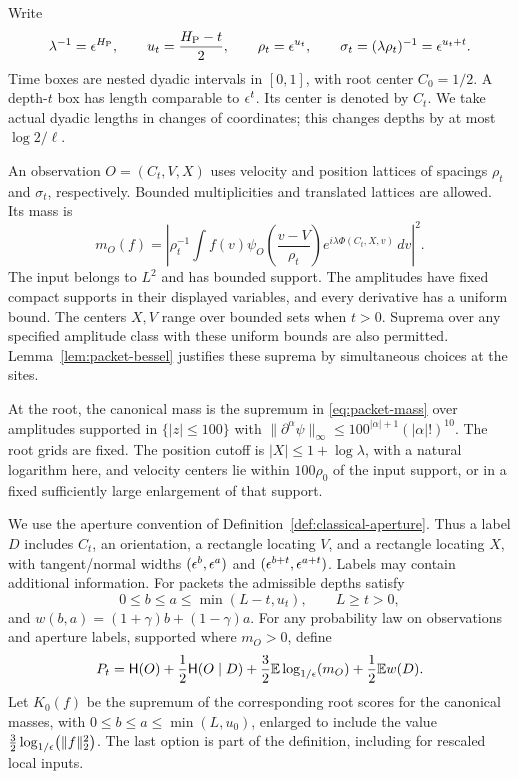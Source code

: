 Write
\begin{equation}
 \lambda^{-1}=\epsilon^{H_{\mathrm P}},\qquad
 u_t=\frac{H_{\mathrm P}-t}{2},\qquad
 \rho_t=\epsilon^{u_t},\qquad
 \sigma_t=(\lambda\rho_t)^{-1}=\epsilon^{u_t+t}.
 \label{eq:packet-scales}
\end{equation}
Time boxes are nested dyadic intervals in \([0,1]\), with root center
\(C_0=1/2\).  A depth-\(t\) box has length comparable to \(\epsilon^t\).
Its center is denoted by \(C_t\).  We take actual dyadic lengths in
changes of coordinates; this changes depths by at most
\(\log 2/\ell\).

An observation \(O=(C_t,V,X)\) uses velocity and position lattices of
spacings \(\rho_t\) and \(\sigma_t\), respectively.  Bounded
multiplicities and translated lattices are allowed.  Its mass is
\begin{equation}
 m_O(f)=\left|\rho_t^{-1}\int f(v)
  \psi_O\left(\frac{v-V}{\rho_t}\right)
  e^{i\lambda\Phi(C_t,X,v)}\,dv\right|^2.
 \label{eq:packet-mass}
\end{equation}
The input belongs to \(L^2\) and has bounded support.  The amplitudes
have fixed compact supports in their displayed variables, and every
derivative has a uniform bound.  The centers \(X,V\) range over bounded
sets when \(t>0\).  Suprema over any specified amplitude class with
these uniform bounds are also permitted.  Lemma~\ref{lem:packet-bessel}
justifies these suprema by simultaneous choices at the sites.

At the root, the canonical mass is the supremum in
\eqref{eq:packet-mass} over amplitudes supported in \(\{|z|\le100\}\)
with
\(\|\partial^\alpha\psi\|_\infty
 \le100^{|\alpha|+1}(|\alpha|!)^{10}\).
The root grids are fixed.  The position cutoff is
\(|X|\le1+\log\lambda\), with a natural logarithm here, and velocity
centers lie within \(100\rho_0\) of the input support, or in a fixed
sufficiently large enlargement of that support.

We use the aperture convention of
Definition~\ref{def:classical-aperture}.  Thus a label \(D\) includes
\(C_t\), an orientation, a rectangle locating \(V\), and a rectangle
locating \(X\), with tangent/normal widths
\((\epsilon^b,\epsilon^a)\) and
\((\epsilon^{b+t},\epsilon^{a+t})\).  Labels may contain additional information.
For packets the admissible depths satisfy
\begin{equation}
 0\le b\le a\le\min(L-t,u_t),\qquad L\ge t>0,
 \label{eq:packet-apertures}
\end{equation}
and \(w(b,a)=(1+\gamma)b+(1-\gamma)a\).
For any probability law on observations and aperture labels, supported
where \(m_O>0\), define
\begin{equation}
 P_t=\mathsf H(O)+\frac12\mathsf H(O\mid D)
       +\frac32\mathbb E\log_{1/\epsilon}\!\left(m_O\right)
       +\frac12\mathbb E w(D).
 \label{eq:packet-score}
\end{equation}
Let \(K_0(f)\) be the supremum of the corresponding root scores for
the canonical masses, with \(0\le b\le a\le\min(L,u_0)\),
enlarged to include the value
\(\frac32\log_{1/\epsilon}\!\left(\|f\|_2^2\right)\).  The last option is part of the
definition, including for rescaled local inputs.

